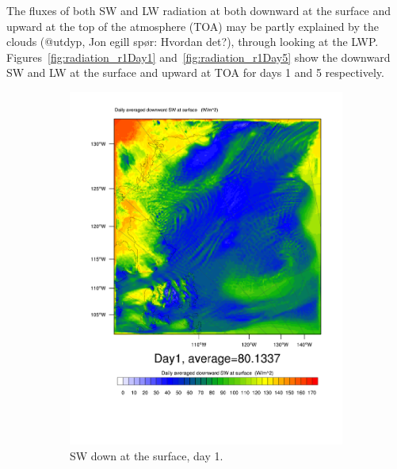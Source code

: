 The fluxes of both SW and LW radiation at both downward at the surface and upward at the top of the atmosphere (TOA) may be partly explained by the clouds (@utdyp, Jon egill spør: Hvordan det?), through looking at the LWP. Figures~\ref{fig:radiation_r1Day1} and~\ref{fig:radiation_r1Day5} show the downward SW and LW at the surface and upward at TOA for days 1 and 5 respectively.
\begin{figure}
\centering
	\begin{subfigure}{0.48\textwidth}
		\includegraphics[width=\textwidth]{results/control/SWDOWN_Day1.pdf}
		\caption{SW down at the surface, day 1.}
		\label{subfig:swdown_r1Day1}
	\end{subfigure}
	\quad
	\begin{subfigure}{0.48\textwidth}
		\centering

\end{subfigure}
\end{figure}
